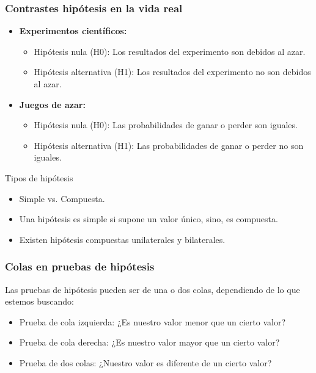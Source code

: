 \documentclass[aspectratio=169]{beamer}
\begin{document}
\begin{frame}
\frametitle{Contrastes hipótesis en la vida real}

\begin{itemize}

\item {\bf Experimentos científicos:}

\begin{itemize}
\item Hipótesis nula (H0): Los resultados del experimento son debidos al azar.
\item Hipótesis alternativa (H1): Los resultados del experimento no son debidos al azar.
\end{itemize}

\item {\bf Juegos de azar:}

\begin{itemize}
\item Hipótesis nula (H0): Las probabilidades de ganar o perder son iguales.
\item Hipótesis alternativa (H1): Las probabilidades de ganar o perder no son iguales.
\end{itemize}
\end{itemize}

\end{frame}





\begin{frame}{Tipos de hipótesis}
    \begin{itemize}
        \item Simple vs. Compuesta.
        \item Una hipótesis es simple si supone un valor único, sino, es compuesta.
        \item Existen hipótesis compuestas unilaterales y bilaterales.
    \end{itemize}
\end{frame}


\begin{frame}
\frametitle{Colas en pruebas de hipótesis}
Las pruebas de hipótesis pueden ser de una o dos colas, dependiendo de lo que estemos buscando:
\begin{itemize}
\item Prueba de cola izquierda: ¿Es nuestro valor menor que un cierto valor?
\item Prueba de cola derecha: ¿Es nuestro valor mayor que un cierto valor?
\item Prueba de dos colas: ¿Nuestro valor es diferente de un cierto valor?
\end{itemize}
\end{frame}
\end{document}
